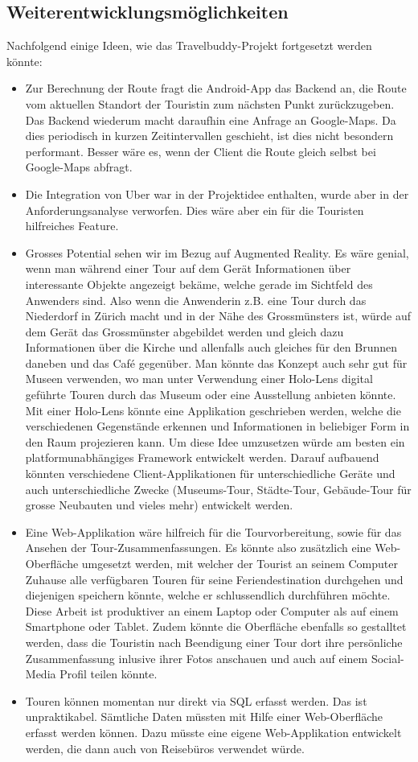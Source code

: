\subsection{Weiterentwicklungsmöglichkeiten}\label{weiterentwicklungsmöglichkeiten}
Nachfolgend einige Ideen, wie das Travelbuddy-Projekt fortgesetzt werden könnte:
\begin{itemize}
  \item Zur Berechnung der Route fragt die Android-App das Backend an, die Route vom aktuellen Standort der Touristin zum nächsten Punkt zurückzugeben. Das Backend wiederum macht daraufhin eine Anfrage an Google-Maps. Da dies periodisch in kurzen Zeitintervallen geschieht, ist dies nicht besondern performant. Besser wäre es, wenn der Client die Route gleich selbst bei Google-Maps abfragt.
  \item Die Integration von Uber war in der Projektidee enthalten, wurde aber in der Anforderungsanalyse verworfen. Dies wäre aber ein für die Touristen hilfreiches Feature.
  \item Grosses Potential sehen wir im Bezug auf Augmented Reality. Es wäre genial, wenn man während einer Tour auf dem Gerät Informationen über interessante Objekte angezeigt bekäme, welche gerade im Sichtfeld des Anwenders sind. Also wenn die Anwenderin z.B. eine Tour durch das Niederdorf in Zürich macht und in der Nähe des Grossmünsters ist, würde auf dem Gerät das Grossmünster abgebildet werden und gleich dazu Informationen über die Kirche und allenfalls auch gleiches für den Brunnen daneben und das Café gegenüber. Man könnte das Konzept auch sehr gut für Museen verwenden, wo man unter Verwendung einer Holo-Lens digital geführte Touren durch das Museum oder eine Ausstellung anbieten könnte. Mit einer Holo-Lens könnte eine Applikation geschrieben werden, welche die verschiedenen Gegenstände erkennen und Informationen in beliebiger Form in den Raum projezieren kann. Um diese Idee umzusetzen würde am besten ein platformunabhängiges Framework entwickelt werden. Darauf aufbauend könnten verschiedene Client-Applikationen für unterschiedliche Geräte und auch unterschiedliche Zwecke (Museums-Tour, Städte-Tour, Gebäude-Tour für grosse Neubauten und vieles mehr) entwickelt werden.
  \item Eine Web-Applikation wäre hilfreich für die Tourvorbereitung, sowie für das Ansehen der Tour-Zusammenfassungen. Es könnte also zusätzlich eine Web-Oberfläche umgesetzt werden, mit welcher der Tourist an seinem Computer Zuhause alle verfügbaren Touren für seine Feriendestination durchgehen und diejenigen speichern könnte, welche er schlussendlich durchführen möchte. Diese Arbeit ist produktiver an einem Laptop oder Computer als auf einem Smartphone oder Tablet. Zudem könnte die Oberfläche ebenfalls so gestalltet werden, dass die Touristin nach Beendigung einer Tour dort ihre persönliche Zusammenfassung inlusive ihrer Fotos anschauen und auch auf einem Social-Media Profil teilen könnte.
  \item Touren können momentan nur direkt via SQL erfasst werden. Das ist unpraktikabel. Sämtliche Daten müssten mit Hilfe einer Web-Oberfläche erfasst werden können. Dazu müsste eine eigene Web-Applikation entwickelt werden, die dann auch von Reisebüros verwendet würde.
\end{itemize}
